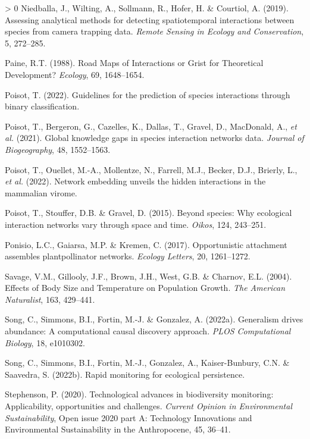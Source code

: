 \documentclass[10pt,oneside]{article}
\newlength{\cslhangindent}
\newenvironment{CSLReferences}[3] %
 {%
  \setlength{\parindent}{0pt}
  \ifodd #1 \everypar{\setlength{\hangindent}{\cslhangindent}}\ignorespaces\fi
  \ifnum #2 > 0
  \setlength{\parskip}{#2\baselineskip}
  \fi
 }%
 {}
\begin{document}
\begin{CSLReferences}{1}{0}
\leavevmode\hypertarget{ref-Niedballa2019AssAna}{}%
Niedballa, J., Wilting, A., Sollmann, R., Hofer, H. \& Courtiol, A.
(2019). Assessing analytical methods for detecting spatiotemporal
interactions between species from camera trapping data. \emph{Remote
Sensing in Ecology and Conservation}, 5, 272--285.

\leavevmode\hypertarget{ref-Paine1988RoaMap}{}%
Paine, R.T. (1988). Road Maps of Interactions or Grist for Theoretical
Development? \emph{Ecology}, 69, 1648--1654.

\leavevmode\hypertarget{ref-Poisot2022GuiPre}{}%
Poisot, T. (2022). Guidelines for the prediction of species interactions
through binary classification.

\leavevmode\hypertarget{ref-Poisot2021GloKno}{}%
Poisot, T., Bergeron, G., Cazelles, K., Dallas, T., Gravel, D.,
MacDonald, A., \emph{et al.} (2021). Global knowledge gaps in species
interaction networks data. \emph{Journal of Biogeography}, 48,
1552--1563.

\leavevmode\hypertarget{ref-Poisot2022NetEmb}{}%
Poisot, T., Ouellet, M.-A., Mollentze, N., Farrell, M.J., Becker, D.J.,
Brierly, L., \emph{et al.} (2022). Network embedding unveils the hidden
interactions in the mammalian virome.

\leavevmode\hypertarget{ref-Poisot2015SpeWhy}{}%
Poisot, T., Stouffer, D.B. \& Gravel, D. (2015). Beyond species: Why
ecological interaction networks vary through space and time.
\emph{Oikos}, 124, 243--251.

\leavevmode\hypertarget{ref-Ponisio2017OppAtt}{}%
Ponisio, L.C., Gaiarsa, M.P. \& Kremen, C. (2017). Opportunistic
attachment assembles plantpollinator networks. \emph{Ecology Letters},
20, 1261--1272.

\leavevmode\hypertarget{ref-Savage2004EffBod}{}%
Savage, V.M., Gillooly, J.F., Brown, J.H., West, G.B. \& Charnov, E.L.
(2004). Effects of Body Size and Temperature on Population Growth.
\emph{The American Naturalist}, 163, 429--441.

\leavevmode\hypertarget{ref-Song2022GenDri}{}%
Song, C., Simmons, B.I., Fortin, M.-J. \& Gonzalez, A. (2022a).
Generalism drives abundance: A computational causal discovery approach.
\emph{PLOS Computational Biology}, 18, e1010302.

\leavevmode\hypertarget{ref-Song2022RapMon}{}%
Song, C., Simmons, B.I., Fortin, M.-J., Gonzalez, A., Kaiser-Bunbury,
C.N. \& Saavedra, S. (2022b). Rapid monitoring for ecological
persistence.

\leavevmode\hypertarget{ref-Stephenson2020TecAdv}{}%
Stephenson, P. (2020). Technological advances in biodiversity
monitoring: Applicability, opportunities and challenges. \emph{Current
Opinion in Environmental Sustainability}, Open issue 2020 part A:
Technology Innovations and Environmental Sustainability in the
Anthropocene, 45, 36--41.


\end{CSLReferences}
\end{document}
